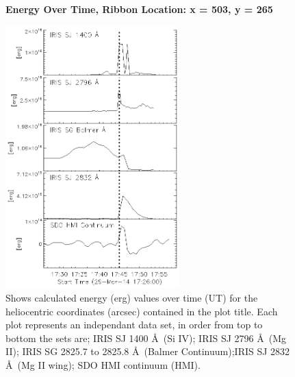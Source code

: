 \begin{figure}[H]
  \begin{center}
  \textbf{Energy Over Time, Ribbon Location: x = 503, y = 265 }\par\medskip
  \includegraphics[width=0.6\textwidth]{29-Mar-14-Ribbon-xyPosition-503-265-Frame-1-Energy-Ladder}
  \end{center}
  \caption{Shows calculated energy (erg) values over time (UT) for the heliocentric coordinates (arcsec) contained in the plot title. Each plot represents an independant data set, in order from top to bottom the sets are; IRIS SJ 1400 \AA\ (Si IV); IRIS SJ 2796 \AA\ (Mg II); IRIS SG  2825.7 to 2825.8 \AA\ (Balmer Continuum);IRIS SJ 2832 \AA\ (Mg II wing); SDO HMI continuum (HMI).}\label{erb7}
\end{figure}

